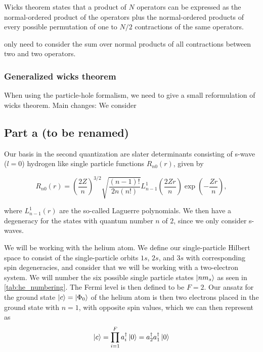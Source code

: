 \documentclass[10pt]{article}
\newcommand{\cop}{a^{\dagger}}
\begin{document}
\begin{multicols}{2}
Wicks theorem states that a product of $N$ operators can be expressed as the
normal-ordered product of the operators plus the normal-ordered products of
every possible permutation of one to $N/2$ contractions of the same
operators.

only
need to consider the sum over normal products of all contractions between
two and two operators. 

\subsubsection{Generalized wicks theorem}

When using the particle-hole formalism, we need to give a small
reformulation of wicks theorem. Main changes: We consider 




\subsection{Part a (to be renamed)}

Our basis in the second
quantization are slater determinants consisting of s-wave ($l=0$) hydrogen like single particle
functions $R_{n0}(r)$, given by

\begin{equation}
    R_{n0}(r) = \left(\frac{2Z}{n}\right)^{3/2}
    \sqrt{\frac{(n-1)!}{2n(n!)}}L_{n-1}^1 (\frac{2Zr}{n})
    \exp(-\frac{Zr}{n}),
\end{equation}

where $L_{n-1}^1(r)$ are the so-called Laguerre polynomials. We then have a
degeneracy for the states with quantum number $n$ of $2$, since we only
consider s-waves. 


We will be working with the helium atom. We define our single-particle
Hilbert space to consist of the single-particle orbits $1s$, $2s$, and $3s$
with corresponding spin degeneracies, and consider that we will be working
with a two-electron system.  We will number the six
possible single particle states $\ket{nm_s}$ as seen in
\cref{tab:he_numbering}. The Fermi level is then defined to be $F = 2$. Our
ansatz for the ground state $\ket{c} = \ket{\Phi_0}$ of the helium atom is
then two electrons placed in the ground state with $n=1$, with opposite
spin values, which we can then represent as
%
\begin{equation}
    \ket{c} = \prod_{i=1}^{F} \cop_i\ket{0} = \cop_2\cop_1\ket{0} 
\end{equation}



\end{multicols}
\end{document}
